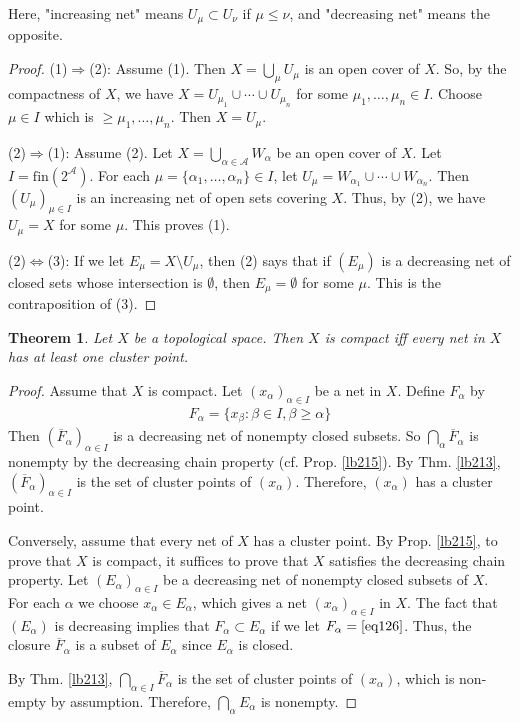 \documentclass[12pt,b5paper,notitlepage]{article}
\theoremstyle{definition}
\theoremstyle{plain}
\newtheorem{thm}[df]{Theorem}
\newcommand{\ovl}{\overline}
\newcommand{\scr}{\mathscr}
\newcommand{\fin}{\mathrm{fin}}
\numberwithin{equation}{section}
\begin{document}
Here, "increasing net" means $U_\mu\subset U_\nu$ if $\mu\leq \nu$, and "decreasing net" means the opposite.

\begin{proof}
(1)$\Rightarrow$(2): Assume (1). Then $X=\bigcup_\mu U_\mu$ is an open cover of $X$. So, by the compactness of $X$, we have $X=U_{\mu_1}\cup\cdots\cup U_{\mu_n}$ for some $\mu_1,\dots,\mu_n\in I$. Choose $\mu\in I$ which is $\geq \mu_1,\dots,\mu_n$. Then $X=U_\mu$.

(2)$\Rightarrow$(1): Assume (2). Let $X=\bigcup_{\alpha\in\scr A} W_\alpha$ be an open cover of $X$. Let $I=\fin(2^{\scr A})$. For each $\mu=\{\alpha_1,\dots,\alpha_n\}\in I$, let $U_\mu=W_{\alpha_1}\cup\cdots\cup W_{\alpha_n}$. Then $(U_\mu)_{\mu\in I}$ is an increasing net of open sets covering $X$. Thus, by (2), we have $U_\mu=X$ for some $\mu$. This proves (1).

(2)$\Leftrightarrow$(3): If we let $E_\mu=X\setminus U_\mu$, then (2) says that if $(E_\mu)$ is a decreasing net of closed sets whose intersection is $\emptyset$, then $E_\mu=\emptyset$ for some $\mu$. This is the contraposition of (3).
\end{proof}


\begin{thm}\label{lb216}
Let $X$ be a topological space. Then $X$ is compact iff every net in $X$ has at least one cluster point.
\end{thm}


\begin{proof}
Assume that $X$ is compact. Let $(x_\alpha)_{\alpha\in I}$ be a net in $X$. Define $F_\alpha$ by 
\begin{align}
F_\alpha=\{x_\beta:\beta\in I,\beta\geq\alpha \}\label{eq126}
\end{align}
Then $(\ovl F_\alpha)_{\alpha\in I}$ is a decreasing net of nonempty closed subsets. So $\bigcap_\alpha\ovl F_\alpha$ is nonempty by the decreasing chain property (cf. Prop. \ref{lb215}). By Thm. \ref{lb213}, $(\ovl F_\alpha)_{\alpha\in I}$ is the set of cluster points of $(x_\alpha)$. Therefore, $(x_\alpha)$ has a cluster point.


Conversely, assume that every net of $X$ has a cluster point. By Prop. \ref{lb215}, to prove that $X$ is compact, it suffices to prove that $X$ satisfies the decreasing chain property. Let $(E_\alpha)_{\alpha\in I}$ be a decreasing net of nonempty closed subsets of $X$. For each $\alpha$ we choose $x_\alpha\in E_\alpha$, which gives a net $(x_\alpha)_{\alpha\in I}$ in $X$. The fact that $(E_\alpha)$ is decreasing implies that $F_\alpha\subset E_\alpha$ if we let $F_\alpha=\eqref{eq126}$. Thus, the closure $\ovl F_\alpha$ is a subset of $E_\alpha$ since $E_\alpha$ is closed. 

By Thm. \ref{lb213},  $\bigcap_{\alpha\in I}\ovl F_\alpha$ is the set of cluster points of $(x_\alpha)$, which is non-empty by assumption. Therefore, $\bigcap_\alpha E_\alpha$ is nonempty.
\end{proof}
\end{document}
